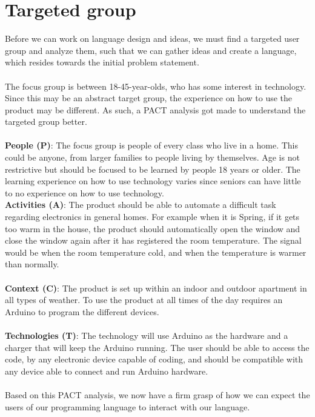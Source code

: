 \section{Targeted group}
\label{targetedGroup}
Before we can work on language design and ideas, we must find a targeted user group and analyze them, such that we can gather ideas and create a language, which resides towards the initial problem statement. \\
\\
The focus group is between 18-45-year-olds, who has some interest in technology. Since this may be an abstract target group, the experience on how to use the product may be different. As such, a PACT analysis got made to understand the targeted group better. \\
\\
\textbf{People (P)}: The focus group is people of every class who live in a home. This could be anyone, from larger families to people living by themselves. Age is not restrictive but should be focused to be learned by people 18 years or older. The learning experience on how to use technology varies since seniors can have little to no experience on how to use technology.
\\
\textbf{Activities (A)}: The product should be able to automate a difficult task regarding electronics in general homes. For example when it is Spring, if it gets too warm in the house, the product should automatically open the window and close the window again after it has registered the room temperature. The signal would be when the room temperature cold, and when the temperature is warmer than normally. \\
\\
\textbf{Context (C)}: The product is set up within an indoor and outdoor apartment in all types of weather. To use the product at all times of the day requires an Arduino to program the different devices.\\
\\
\textbf{Technologies (T)}: The technology will use Arduino as the hardware and a charger that will keep the Arduino running. The user should be able to access the code, by any electronic device capable of coding, and should be compatible with any device able to connect and run Arduino hardware. \\
\\
Based on this PACT analysis, we now have a firm grasp of how we can expect the users of our programming language to interact with our language.